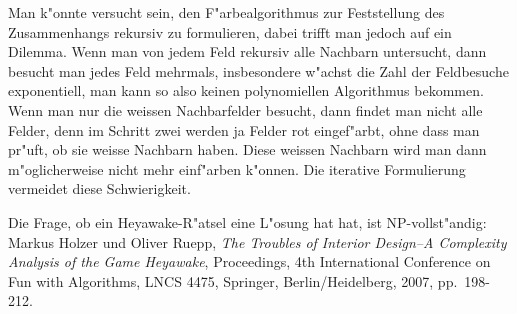\begin{diskussion}
Man k"onnte versucht sein, den F"arbealgorithmus zur Feststellung des
Zusammenhangs rekursiv zu formulieren, dabei trifft man jedoch auf ein
Dilemma.
Wenn man von jedem Feld rekursiv alle Nachbarn untersucht, dann besucht
man jedes Feld mehrmals, insbesondere w"achst die Zahl der Feldbesuche
exponentiell, man kann so also keinen polynomiellen Algorithmus bekommen.
Wenn man nur die weissen Nachbarfelder besucht, dann findet man nicht
alle Felder, denn im Schritt zwei werden ja Felder rot eingef"arbt, ohne 
dass man pr"uft, ob sie weisse Nachbarn haben.
Diese weissen Nachbarn wird man dann m"oglicherweise nicht mehr einf"arben
k"onnen.
Die iterative Formulierung vermeidet diese Schwierigkeit.

Die Frage, ob ein Heyawake-R"atsel eine L"osung hat hat, ist NP-vollst"andig:
Markus Holzer und Oliver Ruepp, {\it The Troubles of Interior Design--A
Complexity Analysis of the Game Heyawake}, Proceedings,
4th International Conference on Fun with Algorithms, LNCS 4475, Springer,
Berlin/Heidelberg, 2007, pp.~198-212.
\end{diskussion}
